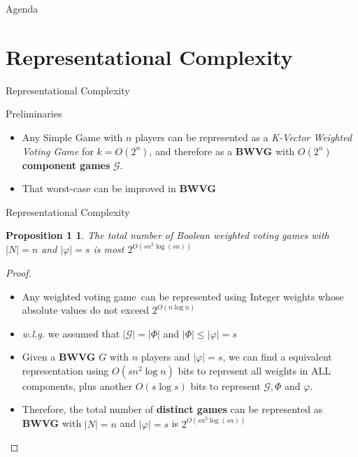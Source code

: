 \documentclass{beamer}
\begin{document}
\begin{frame}[fragile]{Agenda}
  \section{Representational Complexity}
  \tableofcontents[currentsection]
\end{frame}

\begin{frame}[fragile]{Representational Complexity}
  \begin{block}{Preliminaries}
    \begin{itemize}
      \item Any Simple Game with $n$ players can be represented as a \textit{K-Vector Weighted Voting Game}
      for $k = O(2^n)$, and therefore as a \textbf{BWVG} with $O(2^n)$ \textbf{component games} $\mathcal{G}$.
      \item That worst-case can be improved in \textbf{BWVG}
    \end{itemize}
  \end{block}
\end{frame}

\begin{frame}[fragile]{Representational Complexity}
  \newtheorem{prop1}{Proposition 1}
  \begin{prop1}
    The total number of Boolean weighted voting games with $|N| = n$ and $|\varphi| = s$ is
    most $2^{O(sn^2 \log(sn))}$
  \end{prop1}
  \begin{proof}
    \begin{itemize}
      \item Any weighted voting game\footnotemark\ can be represented using Integer weights whose absolute values do not exceed $2^{O(n \log{n})}$
      \item \textit{w.l.g.} we assumed that $|\mathcal{G}| = |\Phi|$ and $|\Phi| \leq |\varphi| = s$
      \item Given a \textbf{BWVG} $G$ with $n$ players and $|\varphi| = s$, we can find a equivalent representation using $O(sn^2 \log{n})$
      bits to represent all weights in ALL components, plus another $O(s \log{s})$ bits to represent $\mathcal{G}, \Phi$ and $\varphi$.
      \item Therefore, the total number of \textbf{distinct games} can be represented as \textbf{BWVG} with $|N| = n$ and $|\varphi| = s$ is
      $2^{O(sn^2 \log(sn))}$
    \end{itemize}
  \end{proof}
\end{frame}
\end{document}

